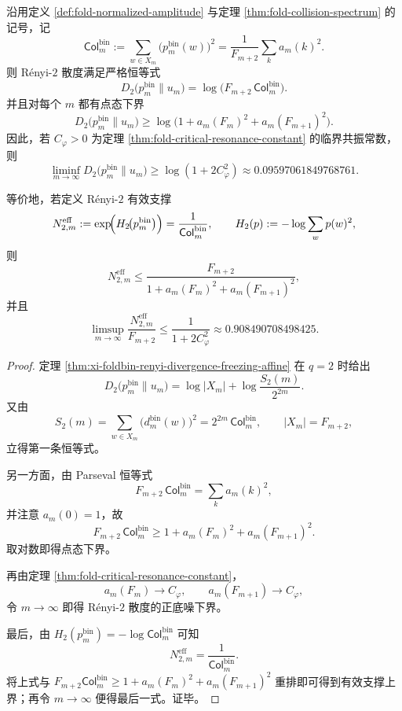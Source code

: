 \begin{theorem}\label{thm:xi-foldbin-critical-resonance-renyi2-floor}
沿用定义 \ref{def:fold-normalized-amplitude} 与定理 \ref{thm:fold-collision-spectrum} 的记号，记
\[
\mathsf{Col}^{\mathrm{bin}}_m
:=
\sum_{w\in X_m}\bigl(p_m^{\mathrm{bin}}(w)\bigr)^2
=
\frac{1}{F_{m+2}}\sum_{k}a_m(k)^2.
\]
则 Rényi-\(2\) 散度满足严格恒等式
\[
\boxed{\;
D_2\!\bigl(p_m^{\mathrm{bin}}\|u_m\bigr)
=
\log\!\bigl(F_{m+2}\,\mathsf{Col}^{\mathrm{bin}}_m\bigr).\;}
\]
并且对每个 \(m\) 都有点态下界
\[
\boxed{\;
D_2\!\bigl(p_m^{\mathrm{bin}}\|u_m\bigr)
\ge
\log\!\bigl(1+a_m(F_m)^2+a_m(F_{m+1})^2\bigr).\;}
\]
因此，若 \(C_\varphi>0\) 为定理 \ref{thm:fold-critical-resonance-constant} 的临界共振常数，则
\[
\boxed{\;
\liminf_{m\to\infty}
D_2\!\bigl(p_m^{\mathrm{bin}}\|u_m\bigr)
\ge
\log(1+2C_\varphi^2)
\approx 0.09597061849768761.\;}
\]

等价地，若定义 Rényi-\(2\) 有效支撑
\[
N_{2,m}^{\mathrm{eff}}
:=
\exp\!\Bigl(H_2\!\bigl(p_m^{\mathrm{bin}}\bigr)\Bigr)
=
\frac{1}{\mathsf{Col}^{\mathrm{bin}}_m},
\qquad
H_2(p):=-\log\sum_w p(w)^2,
\]
则
\[
\boxed{\;
N_{2,m}^{\mathrm{eff}}
\le
\frac{F_{m+2}}{1+a_m(F_m)^2+a_m(F_{m+1})^2},\;}
\]
并且
\[
\boxed{\;
\limsup_{m\to\infty}\frac{N_{2,m}^{\mathrm{eff}}}{F_{m+2}}
\le
\frac{1}{1+2C_\varphi^2}
\approx 0.908490708498425.\;}
\]
\end{theorem}
\begin{proof}
定理 \ref{thm:xi-foldbin-renyi-divergence-freezing-affine} 在 \(q=2\) 时给出
\[
D_2\!\bigl(p_m^{\mathrm{bin}}\|u_m\bigr)
=
\log|X_m|+\log\frac{S_2(m)}{2^{2m}}.
\]
又由
\[
S_2(m)=\sum_{w\in X_m}\bigl(d_m^{\mathrm{bin}}(w)\bigr)^2
=
2^{2m}\,\mathsf{Col}^{\mathrm{bin}}_m,
\qquad
|X_m|=F_{m+2},
\]
立得第一条恒等式。

另一方面，由 Parseval 恒等式
\[
F_{m+2}\,\mathsf{Col}^{\mathrm{bin}}_m=\sum_k a_m(k)^2,
\]
并注意 \(a_m(0)=1\)，故
\[
F_{m+2}\,\mathsf{Col}^{\mathrm{bin}}_m
\ge
1+a_m(F_m)^2+a_m(F_{m+1})^2.
\]
取对数即得点态下界。

再由定理 \ref{thm:fold-critical-resonance-constant}，
\[
a_m(F_m)\to C_\varphi,
\qquad
a_m(F_{m+1})\to C_\varphi,
\]
令 \(m\to\infty\) 即得 Rényi-\(2\) 散度的正底噪下界。

最后，由 \(H_2(p_m^{\mathrm{bin}})=-\log\mathsf{Col}^{\mathrm{bin}}_m\) 可知
\[
N_{2,m}^{\mathrm{eff}}=\frac{1}{\mathsf{Col}^{\mathrm{bin}}_m}.
\]
将上式与
\(
F_{m+2}\mathsf{Col}^{\mathrm{bin}}_m
\ge
1+a_m(F_m)^2+a_m(F_{m+1})^2
\)
重排即可得到有效支撑上界；再令 \(m\to\infty\) 便得最后一式。证毕。
\end{proof}

